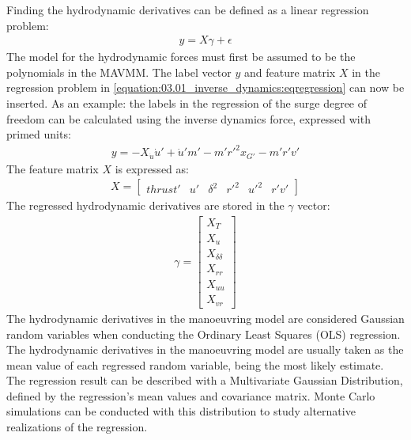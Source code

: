 \documentclass[review]{elsarticle}
\begin{document}
\sphinxAtStartPar
Finding the hydrodynamic derivatives can be defined as a linear regression problem:
\begin{equation}\label{equation:03.01_inverse_dynamics:eqregression}
\begin{split}y = X\gamma + \epsilon\end{split}
\end{equation}
\sphinxAtStartPar
The model for the hydrodynamic forces must first be assumed to be the polynomials in the MAVMM.
The label vector \(y\) and feature matrix \(X\) in the regression problem in \autoref{equation:03.01_inverse_dynamics:eqregression} can now be inserted. As an example: the labels in the regression of the surge degree of freedom can be calculated using the inverse dynamics force, expressed with primed units:
\begin{equation}\label{equation:03.01_inverse_dynamics:diff_eq_X_y}
\begin{split}\displaystyle y = - X_{\dot{u}} \dot{u}' + \dot{u}' m' - m' r'^{2} x_{G'} - m' r' v'\end{split}
\end{equation}
\sphinxAtStartPar
The feature matrix \(X\) is expressed as:
\begin{equation}\label{equation:03.01_inverse_dynamics:diff_eq_X_X}
\begin{split}\displaystyle X = \left[\begin{matrix}thrust' & u' & \delta^{2} & r'^{2} & u'^{2} & r' v'\end{matrix}\right]\end{split}
\end{equation}
\sphinxAtStartPar
The regressed hydrodynamic derivatives are stored in the \(\gamma\) vector:
\begin{equation}\label{equation:03.01_inverse_dynamics:diff_eq_X_beta}
\begin{split}\displaystyle \gamma = \left[\begin{matrix}X_{T}\\X_{u}\\X_{\delta\delta}\\X_{rr}\\X_{uu}\\X_{vr}\end{matrix}\right]\end{split}
\end{equation}
\sphinxAtStartPar
The hydrodynamic derivatives in the manoeuvring model are considered Gaussian random variables when conducting the Ordinary Least Squares (OLS) regression. The hydrodynamic derivatives in the manoeuvring model are usually taken as the mean value of each regressed random variable, being the most likely estimate. The regression result can be described with a Multivariate Gaussian Distribution, defined by the regression’s mean values and covariance matrix. Monte Carlo simulations can be conducted with this distribution to study alternative realizations of the regression.
\end{document}
